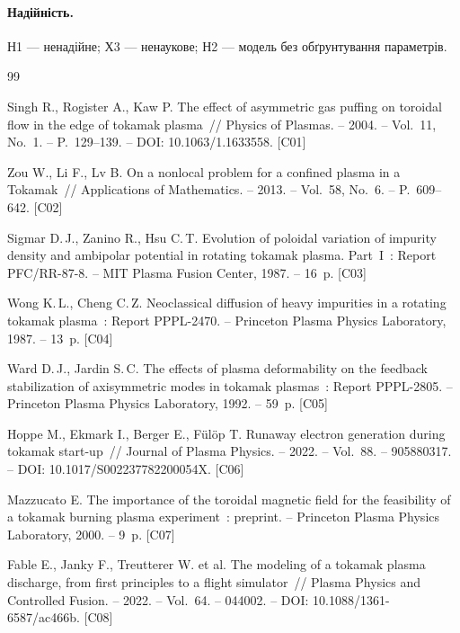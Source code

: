 \documentclass[11pt,a4paper]{article}
\begin{document}
\paragraph{Надійність.} Н1 \cite{Aksenov2015} --- ненадійне; Х3 \cite{Zimnikov2016}
--- ненаукове; Н2 \cite{Duba2018} --- модель без обґрунтування параметрів.

\begin{thebibliography}{99}
\small

 Singh R., Rogister A., Kaw P. The effect of asymmetric gas puffing
  on toroidal flow in the edge of tokamak plasma~// Physics of Plasmas. -- 2004. --
  Vol.~11, No.~1. -- P.~129--139. -- DOI: 10.1063/1.1633558. [C01]

 Zou W., Li F., Lv B. On a nonlocal problem for a confined plasma in
  a Tokamak~// Applications of Mathematics. -- 2013. -- Vol.~58, No.~6. --
  P.~609--642. [C02]

 Sigmar D.\,J., Zanino R., Hsu C.\,T. Evolution of poloidal
  variation of impurity density and ambipolar potential in rotating tokamak plasma.
  Part~I~: Report PFC/RR-87-8. -- MIT Plasma Fusion Center, 1987. -- 16~p. [C03]

 Wong K.\,L., Cheng C.\,Z. Neoclassical diffusion of heavy
  impurities in a rotating tokamak plasma~: Report PPPL-2470. -- Princeton Plasma
  Physics Laboratory, 1987. -- 13~p. [C04]

 Ward D.\,J., Jardin S.\,C. The effects of plasma deformability on
  the feedback stabilization of axisymmetric modes in tokamak plasmas~: Report
  PPPL-2805. -- Princeton Plasma Physics Laboratory, 1992. -- 59~p. [C05]

 Hoppe M., Ekmark I., Berger E., Fülöp T. Runaway electron
  generation during tokamak start-up~// Journal of Plasma Physics. -- 2022. --
  Vol.~88. -- 905880317. -- DOI: 10.1017/S002237782200054X. [C06]

 Mazzucato E. The importance of the toroidal magnetic field
  for the feasibility of a tokamak burning plasma experiment~: preprint. -- Princeton
  Plasma Physics Laboratory, 2000. -- 9~p. [C07]

 Fable E., Janky F., Treutterer W. et al. The modeling of a
  tokamak plasma discharge, from first principles to a flight simulator~// Plasma
  Physics and Controlled Fusion. -- 2022. -- Vol.~64. -- 044002. --
  DOI: 10.1088/1361-6587/ac466b. [C08]


\end{thebibliography}
\end{document}
